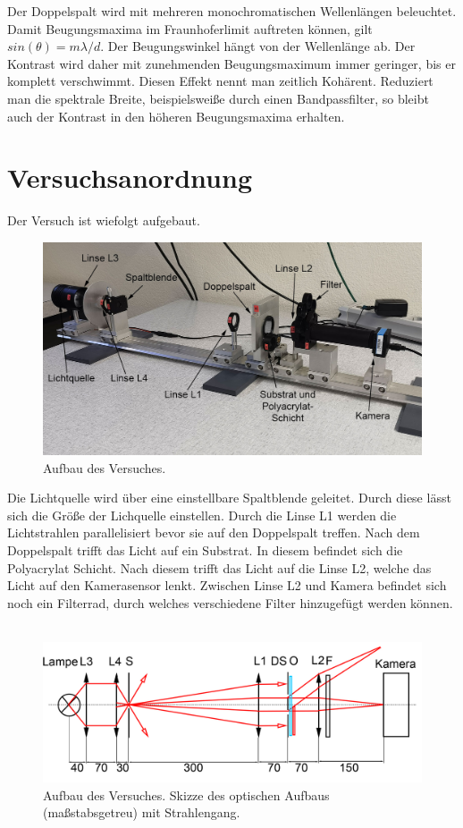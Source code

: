 \documentclass[12pt,a4paper,twoside]{article}
\begin{document}
\noindent
Der Doppelspalt wird mit mehreren monochromatischen Wellenlängen beleuchtet. Damit Beugungsmaxima im Fraunhoferlimit auftreten können, gilt $sin(\theta) = m\lambda /d$. 
Der Beugungswinkel hängt von der Wellenlänge ab. Der Kontrast wird daher mit zunehmenden Beugungsmaximum immer geringer, bis er komplett verschwimmt. Diesen Effekt nennt man zeitlich Kohärent. 
Reduziert man die spektrale Breite, beispielsweiße durch einen Bandpassfilter, so bleibt auch der Kontrast in den höheren Beugungsmaxima erhalten. 

\section{Versuchsanordnung} %
Der Versuch ist wiefolgt aufgebaut. 

\begin{figure}[H]
    \centering
    \includegraphics[width=0.7\linewidth]{nudes/aufbau.jpg}
    \caption{Aufbau des Versuches.}
    \label{fig:aufbau}
\end{figure}

\noindent
Die Lichtquelle wird über eine einstellbare Spaltblende geleitet. Durch diese lässt sich die Größe der Lichquelle einstellen. 
Durch die Linse L1 werden die Lichtstrahlen parallelisiert bevor sie auf den Doppelspalt treffen. 
Nach dem Doppelspalt trifft das Licht auf ein Substrat. In diesem befindet sich die Polyacrylat Schicht. 
Nach diesem trifft das Licht auf die Linse L2, welche das Licht auf den Kamerasensor lenkt. 
Zwischen Linse L2 und Kamera befindet sich noch ein Filterrad, durch welches verschiedene Filter hinzugefügt werden können. 
\\
\\
\begin{figure}[H]
    \centering
    \includegraphics[width=0.7\linewidth]{nudes/strahlengang.jpg}
    \caption{Aufbau des Versuches. Skizze des optischen Aufbaus (maßstabsgetreu) mit Strahlengang. }
    \label{fig:aufbau schema}
\end{figure}
\end{document}
